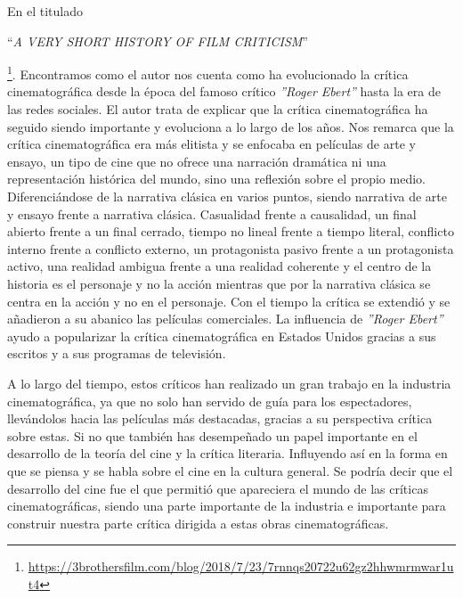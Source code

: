 En el titulado \begin{otherlanguage}{english}``\textit{A VERY SHORT HISTORY OF FILM CRITICISM}''\end{otherlanguage}\cite{3BrothersArticle} \footnote{\url{https://3brothersfilm.com/blog/2018/7/23/7rnnqs20722u62gz2hhwmrmwar1ut4}}. Encontramos como el autor nos cuenta como ha evolucionado la crítica cinematográfica desde la época del famoso crítico \textit{''Roger Ebert''} hasta la era de las redes sociales. El autor trata de explicar que la crítica cinematográfica ha seguido siendo importante y evoluciona a lo largo de los años. Nos remarca que la crítica cinematográfica era más elitista y se enfocaba en películas de arte y ensayo, un tipo de cine que no ofrece una narración dramática ni una representación histórica del mundo, sino una reflexión sobre el propio medio. Diferenciándose de la narrativa clásica en varios puntos, siendo narrativa de arte y ensayo frente a narrativa clásica. Casualidad frente a  causalidad, un final abierto frente a un final cerrado, tiempo no lineal frente a tiempo literal, conflicto interno frente a conflicto externo, un protagonista pasivo frente a un protagonista activo, una realidad ambigua frente a una realidad coherente y el centro de la historia es el personaje y no la acción mientras que por la narrativa clásica se centra en la acción y no en el personaje. Con el tiempo la crítica se extendió y se añadieron a su abanico las películas comerciales. La influencia de \textit{''Roger Ebert''} ayudo a popularizar la crítica cinematográfica en Estados Unidos gracias a sus escritos y a sus programas de televisión. 

A lo largo del tiempo, estos críticos han realizado un gran trabajo en la industria cinematográfica, ya que no solo han servido de guía para los espectadores, llevándolos hacia las películas más destacadas, gracias a su perspectiva crítica sobre estas. Si no que también has desempeñado un papel importante en el desarrollo de la teoría del cine y la crítica literaria. Influyendo así en la forma en que se piensa y se habla sobre el cine en la cultura general. Se podría decir que el desarrollo del cine fue el que permitió que apareciera el mundo de las críticas cinematográficas, siendo una parte importante de la industria e importante para construir nuestra parte crítica dirigida a estas obras cinematográficas.

